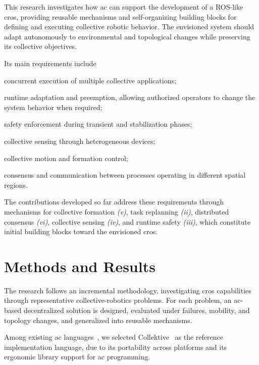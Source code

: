 \documentclass[conference]{IEEEtran}
\begin{document}
This research investigates how \ac{ac} can support the development of a ROS-like~\cite{ros} \ac{cros},
providing reusable mechanisms and self-organizing building blocks for defining and executing collective robotic behavior.
%
The envisioned system should adapt autonomously to environmental and topological changes while preserving its collective objectives.

Its main requirements include
\begin{inlinelist}
    \item concurrent execution of multiple collective applications;
    \item runtime adaptation and preemption,
    allowing authorized operators to change the system behavior when required;
    \item safety enforcement during transient and stabilization phases;
    \item collective sensing through heterogeneous devices;
    \item collective motion and formation control;
    \item consensus and communication between processes operating in different spatial regions.
\end{inlinelist}

The contributions developed so far address these requirements through mechanisms for collective formation \emph{(v)},
task replanning \emph{(ii)},
distributed consensus \emph{(vi)},
collective sensing \emph{(iv)},
and runtime safety \emph{(iii)},
which constitute initial building blocks toward the envisioned \ac{cros}.

\section{Methods and Results}\label{sec:methods-and-results}

The research follows an incremental methodology,
investigating \ac{cros} capabilities through representative collective-robotics problems.
%
For each problem,
an \ac{ac}-based decentralized solution is designed,
evaluated under failures,
mobility,
and topology changes,
and generalized into reusable mechanisms.


Among existing \ac{ac} languages~\cite{DBLP:journals/tocl/AudritoVDPB19,DBLP:journals/softx/CasadeiVAP22,DBLP:journals/corr/abs-2603-29999},
we selected Collektive~\cite{DBLP:conf/acsos/Cortecchia24} as the reference implementation language,
due to its portability across platforms and its ergonomic library support for \ac{ac} programming.
\end{document}
